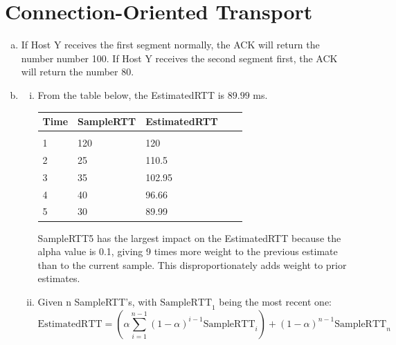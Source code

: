 \documentclass[11pt]{article}
\begin{document}
\section*{Connection-Oriented Transport}
  \begin{enumerate}[(a)]
    \item
      If Host Y receives the first segment normally, the ACK will return the number
      number 100. If Host Y receives the second segment first, the ACK will return the
      number 80.
    \item
      \begin{enumerate}[(i)]
        \item
          From the table below, the EstimatedRTT is $\boxed{89.99}$ ms.

          \begin{table}[H]
            \begin{tabular}{lllll}
            \hline
            Time & SampleRTT & EstimatedRTT &  &  \\
            \hline \\
            1    & 120       & 120          &  &  \\
            2    & 25        & 110.5        &  &  \\
            3    & 35        & 102.95       &  &  \\
            4    & 40        & 96.66        &  &  \\
            5    & 30        & 89.99        &  & \\
            \hline
            \end{tabular}
          \end{table}

          SampleRTT5 has the largest impact on the EstimatedRTT because the alpha
          value is 0.1, giving 9 times more weight to the previous estimate
          than to the current sample. This disproportionately adds weight
          to prior estimates.
        \item
          Given n SampleRTT's, with $\text{SampleRTT}_1$ being the most recent one:
          \[ \text{EstimatedRTT} = \left( \alpha \sum^{n-1}_{i=1} (1 - \alpha)^{i-1} \text{SampleRTT}_i \right) + (1 - \alpha)^{n-1} \text{SampleRTT}_n \]


\end{enumerate}
\end{enumerate}
\end{document}
